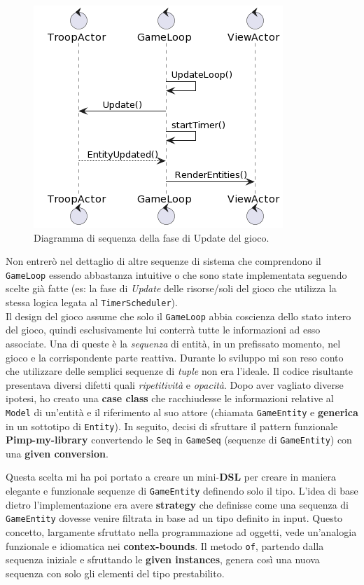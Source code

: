 \begin{figure}[H]
    \centering
    \includegraphics[width=0.61\linewidth]{images/game-update.png}
    \caption{Diagramma di sequenza della fase di Update del gioco.}
\end{figure}
Non entrerò nel dettaglio di altre sequenze di sistema che comprendono il \texttt{GameLoop} essendo abbastanza intuitive o che sono state implementata seguendo scelte già fatte (es: la fase di \textit{Update} delle risorse/soli del gioco che utilizza la stessa logica legata al \texttt{TimerScheduler}).\\

Il design del gioco assume che solo il \texttt{GameLoop} abbia coscienza dello stato intero del gioco, quindi esclusivamente lui conterrà tutte le informazioni ad esso associate. Una di queste è la \textit{sequenza} di entità, in un prefissato momento, nel gioco e la corrispondente parte reattiva. Durante lo sviluppo mi son reso conto che utilizzare delle semplici sequenze di \textit{tuple} non era l'ideale. Il codice risultante presentava diversi difetti quali \textit{ripetitività} e \textit{opacità}. Dopo aver vagliato diverse ipotesi, ho creato una \textbf{case class} che racchiudesse le informazioni relative al \texttt{Model} di un'entità e il riferimento al suo attore (chiamata \texttt{GameEntity} e \textbf{generica} in un sottotipo di \texttt{Entity}). In seguito, decisi di sfruttare il pattern funzionale \textbf{Pimp-my-library} convertendo le \texttt{Seq} in \texttt{GameSeq} (sequenze di \texttt{GameEntity}) con una \textbf{given conversion}.



Questa scelta mi ha poi portato a creare un mini-\textbf{DSL} per creare in maniera elegante e funzionale sequenze di \texttt{GameEntity} definendo solo il tipo. L'idea di base dietro l'implementazione era avere \textbf{strategy} che definisse come una sequenza di \texttt{GameEntity} dovesse venire filtrata in base ad un tipo definito in input. Questo concetto, largamente sfruttato nella programmazione ad oggetti, vede un'analogia funzionale e idiomatica nei \textbf{contex-bounds}. Il metodo \texttt{of}, partendo dalla sequenza iniziale e sfruttando le \textbf{given instances}, genera così una nuova sequenza con solo gli elementi del tipo prestabilito.

